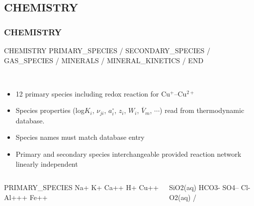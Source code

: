 \documentclass{beamer}
\begin{document}
\subsection{CHEMISTRY}

\begin{frame}\frametitle{\bf CHEMISTRY}

\begin{semiverbatim}

CHEMISTRY
  PRIMARY_SPECIES
  /
  SECONDARY_SPECIES
  /
  GAS_SPECIES
  /
  MINERALS
  /
  MINERAL_KINETICS
  /
END
\end{semiverbatim}

\newpage
~

\begin{itemize}

\item 12 primary species including redox reaction for Cu$^+$--Cu$^{2+}$
\item Species properties (log$K_i$, $\nu_{ji}$, $a_i^\circ$, $z_i$, $W_i$, $\overline V_m$, $\cdots$) read from thermodynamic database.
\item Species names must match database entry
\item Primary and secondary species interchangeable provided reaction network linearly independent
\end{itemize}
\begin{columns}[c]
\begin{semiverbatim}
  PRIMARY_SPECIES
    Na+
    K+
    Ca++
    H+
    Cu++
    Al+++
    Fe++
\end{semiverbatim}
\begin{semiverbatim}
    SiO2(aq)
    HCO3-
    SO4--
    Cl-
    O2(aq)
  /
\end{semiverbatim}
  \end{columns}


\end{frame}
\end{document}
